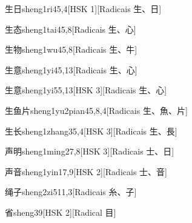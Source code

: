 \begin{entry}{生日}{sheng1ri4}{5,4}[HSK 1][Radicais ⽣、⽇]
\end{entry}

\begin{entry}{生态}{sheng1tai4}{5,8}[Radicais ⽣、⼼]
\end{entry}

\begin{entry}{生物}{sheng1wu4}{5,8}[Radicais ⽣、⽜]
\end{entry}

\begin{entry}{生意}{sheng1yi4}{5,13}[Radicais ⽣、⼼]
\end{entry}

\begin{entry}{生意}{sheng1yi5}{5,13}[HSK 3][Radicais ⽣、⼼]
\end{entry}

\begin{entry}{生鱼片}{sheng1yu2pian4}{5,8,4}[Radicais ⽣、⿂、⽚]
\end{entry}

\begin{entry}{生长}{sheng1zhang3}{5,4}[HSK 3][Radicais ⽣、⾧]
\end{entry}

\begin{entry}{声明}{sheng1ming2}{7,8}[HSK 3][Radicais ⼠、⽇]
\end{entry}

\begin{entry}{声音}{sheng1yin1}{7,9}[HSK 2][Radicais ⼠、⾳]
\end{entry}

\begin{entry}{绳子}{sheng2zi5}{11,3}[Radicais ⽷、⼦]
\end{entry}

\begin{entry}{省}{sheng3}{9}[HSK 2][Radical ⽬]
\end{entry}

